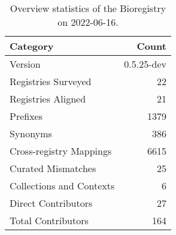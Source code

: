 \begin{table}
\centering
\caption{Overview statistics of the Bioregistry on 2022-06-16.}
\label{tab:bioregistry-summary}
\begin{tabular}{lr}
\toprule
                Category &      Count \\
\midrule
                 Version & 0.5.25-dev \\
     Registries Surveyed &         22 \\
      Registries Aligned &         21 \\
                Prefixes &       1379 \\
                Synonyms &        386 \\
 Cross-registry Mappings &       6615 \\
      Curated Mismatches &         25 \\
Collections and Contexts &          6 \\
     Direct Contributors &         27 \\
      Total Contributors &        164 \\
\bottomrule
\end{tabular}
\end{table}
